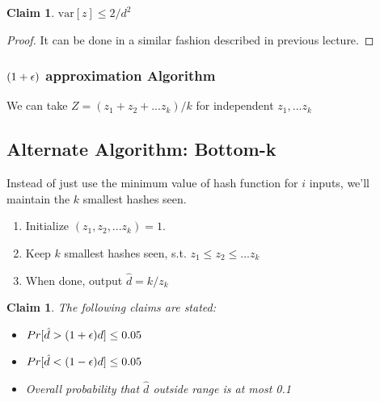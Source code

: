 \documentclass[11pt]{article}
\newtheorem{claim}[theorem]{Claim}
\def\eps{\ensuremath\epsilon}
\begin{document}
\begin{claim}
$\text{var}[z] \leq 2/d^{2}$
\end{claim}

\begin{proof}
It can be done in a similar fashion described in previous lecture.
\end{proof}

\subsubsection{$(1+\eps)$ approximation Algorithm }
We can take $Z = (z_{1} + z_{2} + ... z_{k})/k$ for independent $z_{1}, ... z_{k}$

\subsection{Alternate Algorithm: Bottom-k}
Instead of just use the minimum value of hash function for $i$ inputs, we'll maintain the $k$ smallest hashes seen.
\begin{enumerate}
\item Initialize $(z_{1}, z_{2},...z_{k}) = 1$.
\item Keep $k$ smallest hashes seen, s.t. $z_{1}\leq z_{2}\leq...z_{k}$
\item When done, output $\hat{d} = k/z_{k}$
\end{enumerate}

\begin{claim}
The following claims are stated:
\begin{itemize}
\item $Pr[\hat{d} > (1 + \eps)d] \leq 0.05$
\item $Pr[\hat{d} < (1 - \eps)d] \leq 0.05$
\item Overall probability that $\hat{d}$ outside range is at most 0.1
\end{itemize}
\end{claim}
\end{document}
